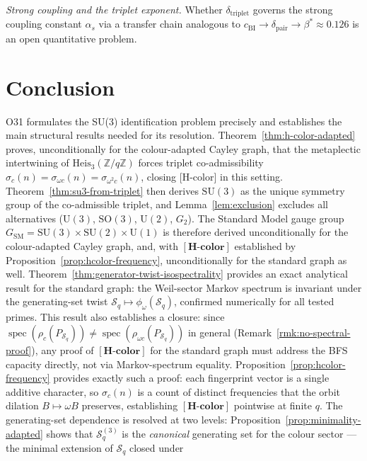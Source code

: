 \documentclass[11pt,a4paper]{article}
\theoremstyle{definition}
\theoremstyle{remark}
\newcommand{\Heis}{\mathrm{Heis}}
\newcommand{\SU}{\mathrm{SU}}
\newcommand{\cBI}{c_{\mathrm{BI}}}
\newcommand{\dpair}{\delta_{\mathrm{pair}}}
\newcommand{\dtriplet}{\delta_{\mathrm{triplet}}}
\newcommand{\Hcolor}{\mathbf{[H\text{-}color]}}
\newcommand{\Z}{\mathbb{Z}}
\newcommand{\Sq}{\mathcal{S}_q}
\begin{document}
      \emph{Strong coupling and the triplet exponent.}
      Whether $\dtriplet$ governs the strong coupling constant $\alpha_s$ via a transfer chain
      analogous to $\cBI \to \dpair \to \beta^* \approx 0.126$ is an open quantitative problem.

  \section{Conclusion}
    \label{sec:conclusion}

    O31 formulates the SU(3) identification problem precisely and establishes the main structural
    results needed for its resolution.
    Theorem~\ref{thm:h-color-adapted} proves, unconditionally for the colour-adapted Cayley graph,
    that the metaplectic intertwining of $\Heis_3(\Z/q\Z)$ forces triplet co-admissibility
    $\sigma_c(n) = \sigma_{\omega c}(n) = \sigma_{\omega^2 c}(n)$, closing [H-color] in this
    setting.
    Theorem~\ref{thm:su3-from-triplet} then derives $\SU(3)$ as the unique symmetry group of the
    co-admissible triplet, and Lemma~\ref{lem:exclusion} excludes all alternatives
    ($\mathrm{U}(3)$, $\mathrm{SO}(3)$, $\mathrm{U}(2)$, $G_2$).
    The Standard Model gauge group $G_{\mathrm{SM}} = \SU(3) \times \SU(2) \times \mathrm{U}(1)$
    is therefore derived unconditionally for the colour-adapted Cayley graph, and, with $\Hcolor$
    established by Proposition~\ref{prop:hcolor-frequency}, unconditionally for the standard graph as
    well.
    Theorem~\ref{thm:generator-twist-isospectrality} provides an exact analytical result for the
    standard graph: the Weil-sector Markov spectrum is invariant under the generating-set twist
    $\Sq \mapsto \phi_\omega(\Sq)$, confirmed numerically for all tested primes.
    This result also establishes a closure: since
    $\operatorname{spec}(\rho_c(P_{\Sq})) \neq \operatorname{spec}(\rho_{\omega c}(P_{\Sq}))$
    in general (Remark~\ref{rmk:no-spectral-proof}), any proof of $\Hcolor$ for the standard graph
    must address the BFS capacity directly, not via Markov-spectrum equality.
    Proposition~\ref{prop:hcolor-frequency} provides exactly such a proof: each fingerprint vector is
    a single additive character, so $\sigma_c(n)$ is a count of distinct frequencies that the orbit
    dilation $B \mapsto \omega B$ preserves, establishing $\Hcolor$ pointwise at finite $q$.
    The generating-set dependence is resolved at two levels:
    Proposition~\ref{prop:minimality-adapted} shows that $\Sq^{(3)}$ is the \emph{canonical}
    generating set for the colour sector --- the minimal extension of $\Sq$ closed under
\end{document}
